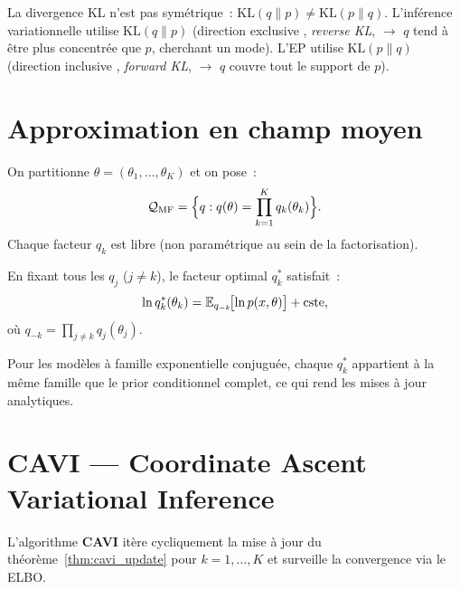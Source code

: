 \begin{attention}
La divergence KL n'est pas sym\'etrique~: $\mathrm{KL}(q \| p) \neq \mathrm{KL}(p \| q)$.
L'inf\'erence variationnelle utilise $\mathrm{KL}(q \| p)$ (direction \og exclusive \fg,
\emph{reverse KL}, $\to$ $q$ tend \`a \^etre plus concentr\'ee que $p$, cherchant un mode).
L'EP utilise $\mathrm{KL}(p \| q)$ (direction \og inclusive \fg, \emph{forward KL},
$\to$ $q$ couvre tout le support de $p$).
\end{attention}

\section{Approximation en champ moyen}

\begin{definition}
On partitionne $\theta = (\theta_1, \ldots, \theta_K)$ et on pose~:
\[
  \mathcal{Q}_{\mathrm{MF}} = \Bigl\{ q : q(\theta) = \prod_{k=1}^K q_k(\theta_k) \Bigr\}.
\]
Chaque facteur $q_k$ est libre (non param\'etrique au sein de la factorisation).
\end{definition}

\begin{theoreme}
\label{thm:cavi_update}
En fixant tous les $q_j$ ($j \neq k$), le facteur optimal $q_k^*$ satisfait~:
\[
  \ln q_k^*(\theta_k) = \mathbb{E}_{q_{-k}}\!\bigl[\ln p(x, \theta)\bigr] + \mathrm{cste},
\]
o\`u $q_{-k} = \prod_{j \neq k} q_j(\theta_j)$.
\end{theoreme}

\begin{remarque}
Pour les mod\`eles \`a famille exponentielle conjugu\'ee, chaque $q_k^*$ appartient
\`a la m\^eme famille que le prior conditionnel complet, ce qui rend les mises \`a
jour analytiques.
\end{remarque}

\section{CAVI --- Coordinate Ascent Variational Inference}

\begin{definition}
L'algorithme \textbf{CAVI} it\`ere cycliquement la mise \`a jour du
th\'eor\`eme~\ref{thm:cavi_update} pour $k = 1, \ldots, K$ et
surveille la convergence via le ELBO.
\end{definition}

